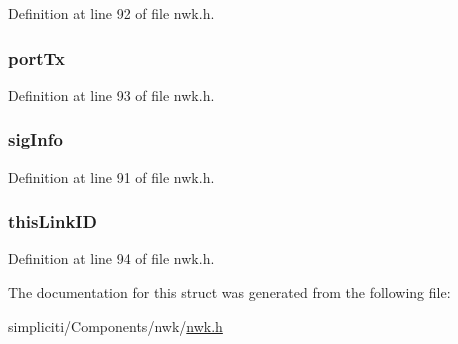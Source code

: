 \-Definition at line 92 of file nwk.\-h.

\hypertarget{structconnInfo__t_ad86d0317b274fcbe4afb501072a6483f}{
\subsubsection[{port\-Tx}]{ {\bf port\-Tx}}}\label{structconnInfo__t_ad86d0317b274fcbe4afb501072a6483f}


\-Definition at line 93 of file nwk.\-h.

\hypertarget{structconnInfo__t_a87903a190e749b4aa6e73a2aa5d18ff1}{
\subsubsection[{sig\-Info}]{ {\bf sig\-Info}}}\label{structconnInfo__t_a87903a190e749b4aa6e73a2aa5d18ff1}


\-Definition at line 91 of file nwk.\-h.

\hypertarget{structconnInfo__t_aa316c2271456d83341ee386bf74e558f}{
\subsubsection[{this\-Link\-I\-D}]{ {\bf this\-Link\-I\-D}}}\label{structconnInfo__t_aa316c2271456d83341ee386bf74e558f}


\-Definition at line 94 of file nwk.\-h.



\-The documentation for this struct was generated from the following file\-:\begin{DoxyCompactItemize}
\item 
simpliciti/\-Components/nwk/\hyperlink{nwk_8h}{nwk.\-h}\end{DoxyCompactItemize}
